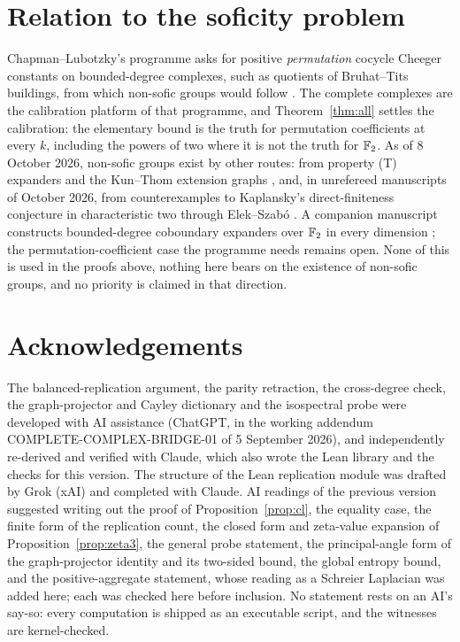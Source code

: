 \documentclass[11pt]{article}
\theoremstyle{remark}\newtheorem{remark}[theorem]{Remark}
\begin{document}
\section{Relation to the soficity problem}
Chapman--Lubotzky's programme asks for positive \emph{permutation} cocycle Cheeger constants on bounded-degree complexes, such as quotients of Bruhat--Tits buildings, from which non-sofic groups would follow \cite[Section~6.1]{CL2}. The complete complexes are the calibration platform of that programme, and Theorem~\ref{thm:all} settles the calibration: the elementary bound is the truth for permutation coefficients at every $k$, including the powers of two where it is not the truth for $\mathbb{F}_2$. As of 8 October 2026, non-sofic groups exist by other routes: from property (T) expanders and the Kun--Thom extension graphs \cite{Astra,FF,KT,AT}, and, in unrefereed manuscripts of October 2026, from counterexamples to Kaplansky's direct-finiteness conjecture in characteristic two \cite{OAIkap1,OAIkap2} through Elek--Szab\'o \cite{ES}. A companion manuscript constructs bounded-degree coboundary expanders over $\mathbb{F}_2$ in every dimension \cite{OAIexp}; the permutation-coefficient case the programme needs remains open. None of this is used in the proofs above, nothing here bears on the existence of non-sofic groups, and no priority is claimed in that direction.

\section*{Acknowledgements}
The balanced-replication argument, the parity retraction, the cross-degree check, the graph-projector and Cayley dictionary and the isospectral probe were developed with AI assistance (ChatGPT, in the working addendum COMPLETE-COMPLEX-BRIDGE-01 of 5 September 2026), and independently re-derived and verified with Claude, which also wrote the Lean library and the checks for this version. The structure of the Lean replication module was drafted by Grok (xAI) and completed with Claude. AI readings of the previous version suggested writing out the proof of Proposition~\ref{prop:cl}, the equality case, the finite form of the replication count, the closed form and zeta-value expansion of Proposition~\ref{prop:zeta3}, the general probe statement, the principal-angle form of the graph-projector identity and its two-sided bound, the global entropy bound, and the positive-aggregate statement, whose reading as a Schreier Laplacian was added here; each was checked here before inclusion. No statement rests on an AI's say-so: every computation is shipped as an executable script, and the witnesses are kernel-checked.
\end{document}
